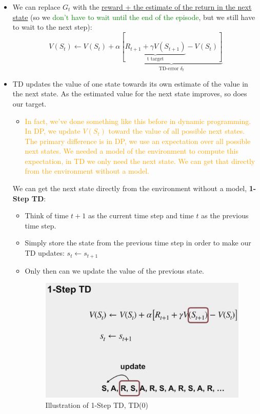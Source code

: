 \documentclass[12pt, a4paper]{article}
\begin{document}
\begin{itemize}
  \item We can replace $G_t$ with the \uline{reward + the estimate of the return in the next state} (so we \textcolor{Green}{don't have to wait until the end of the episode}, but we still have to wait to the next step):
  $$V(S_t) \leftarrow V(S_t) + \alpha \underbrace{[\underbrace{R_{t+1} + \gamma V(S_{t+1})}_\text{t target} - V(S_t)]}_\text{TD-error $\delta_t$}$$
  \item TD updates the value of one state towards its own estimate of the value in the next state. As the estimated value for the next state improves, so does our target.
  \begin{itemize}
    \item \textcolor{Orange}{In fact, we've done something like this before in dynamic programming. In DP, we update $V(S_t)$ toward the value of all possible next states. The primary difference is in DP, we use an expectation over all possible next states. We needed a model of the environment to compute this expectation, in TD we only need the next state. We can get that directly from the environment without a model.}
  \end{itemize}

  We can get the next state directly from the environment without a model, \textbf{1-Step TD}:
  \begin{itemize}
    \item Think of time $t+1$ as the current time step and time $t$ as the previous time step.
    \item Simply store the state from the previous time step in order to make our TD updates: $s_t \leftarrow s_{t+1}$
    \item Only then can we update the value of the previous state.
    \begin{figure}[H]
      \centering  %
        \includegraphics[width=0.7\columnwidth]{images/1-step-td.png}
        \caption{Illustration of 1-Step TD, TD(0)}
        \label{fig:1-step-td}
    \end{figure}
  \end{itemize}
\end{itemize}
\end{document}
